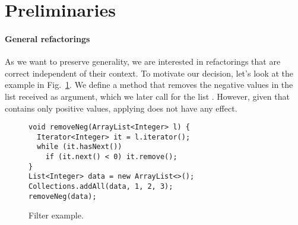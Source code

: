 \documentclass[runningheads,a4paper]{llncs}
\begin{document}


\section{Preliminaries} \label{sec:preliminaries}


%

\paragraph{General refactorings}
As we want to preserve generality, 
we are interested in  refactorings that are
correct independent of their context.  To motivate our decision, let's
look at the example in Fig.~\ref{ex:filter1}.  We define a method
 that removes the negative values in the list received as
argument, which we later call for the list .  However, given that
 contains only positive values, applying  does not
have any effect.

\begin{figure}
  \begin{lstlisting}[mathescape=true,showstringspaces=false]
void removeNeg(ArrayList<Integer> l) {
  Iterator<Integer> it = l.iterator();
  while (it.hasNext())
    if (it.next() < 0) it.remove();
}
List<Integer> data = new ArrayList<>();
Collections.addAll(data, 1, 2, 3);
removeNeg(data);
\end{lstlisting}
\caption{Filter example.}
\label{ex:filter1}
\end{figure}
\end{document}
